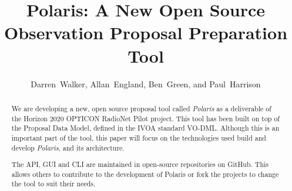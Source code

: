 \documentclass[11pt,twoside]{article}
\begin{document}
\title{Polaris: A New Open Source Observation Proposal Preparation Tool}

\author{Darren~Walker, Allan~England, Ben~Green, and Paul~Harrison}





\begin{abstract}
    We are developing a new, open source proposal tool called \emph{Polaris} as a deliverable of the Horizon
    2020 OPTICON RadioNet Pilot project.
    This tool has been built on top of the Proposal Data Model, defined in the IVOA standard VO-DML\@.
    Although this is an important part of the tool, this paper will focus on the technologies
    used build and develop \emph{Polaris}, and its architecture.

    The API, GUI and CLI are maintained in open-source repositories on GitHub.
    This allows others to contribute to the development of Polaris or fork the projects to change the tool
    to suit their needs.
\end{abstract}
\end{document}
